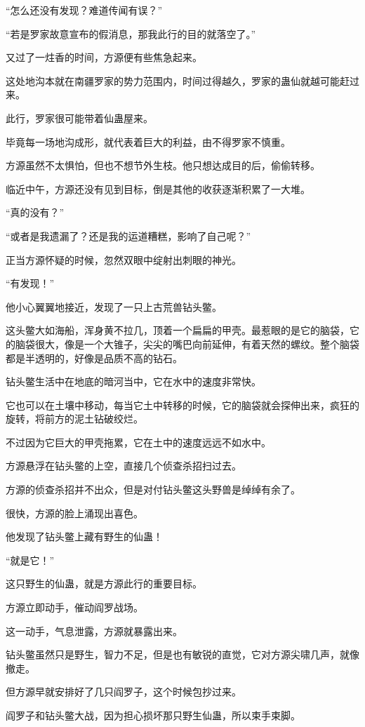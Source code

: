 \begin{this_body}
“怎么还没有发现？难道传闻有误？”

“若是罗家故意宣布的假消息，那我此行的目的就落空了。”

又过了一炷香的时间，方源便有些焦急起来。

这处地沟本就在南疆罗家的势力范围内，时间过得越久，罗家的蛊仙就越可能赶过来。

此行，罗家很可能带着仙蛊屋来。

毕竟每一场地沟成形，就代表着巨大的利益，由不得罗家不慎重。

方源虽然不太惧怕，但也不想节外生枝。他只想达成目的后，偷偷转移。

临近中午，方源还没有见到目标，倒是其他的收获逐渐积累了一大堆。

“真的没有？”

“或者是我遗漏了？还是我的运道糟糕，影响了自己呢？”

正当方源怀疑的时候，忽然双眼中绽射出刺眼的神光。

“有发现！”

他小心翼翼地接近，发现了一只上古荒兽钻头鳖。

这头鳖大如海船，浑身黄不拉几，顶着一个扁扁的甲壳。最惹眼的是它的脑袋，它的脑袋很大，像是一个大锥子，尖尖的嘴巴向前延伸，有着天然的螺纹。整个脑袋都是半透明的，好像是品质不高的钻石。

钻头鳖生活中在地底的暗河当中，它在水中的速度非常快。

它也可以在土壤中移动，每当它土中转移的时候，它的脑袋就会探伸出来，疯狂的旋转，将前方的泥土钻破绞烂。

不过因为它巨大的甲壳拖累，它在土中的速度远远不如水中。

方源悬浮在钻头鳖的上空，直接几个侦查杀招扫过去。

方源的侦查杀招并不出众，但是对付钻头鳖这头野兽是绰绰有余了。

很快，方源的脸上涌现出喜色。

他发现了钻头鳖上藏有野生的仙蛊！

“就是它！”

这只野生的仙蛊，就是方源此行的重要目标。

方源立即动手，催动阎罗战场。

这一动手，气息泄露，方源就暴露出来。

钻头鳖虽然只是野生，智力不足，但是也有敏锐的直觉，它对方源尖啸几声，就像撤走。

但方源早就安排好了几只阎罗子，这个时候包抄过来。

阎罗子和钻头鳖大战，因为担心损坏那只野生仙蛊，所以束手束脚。


\end{this_body}
